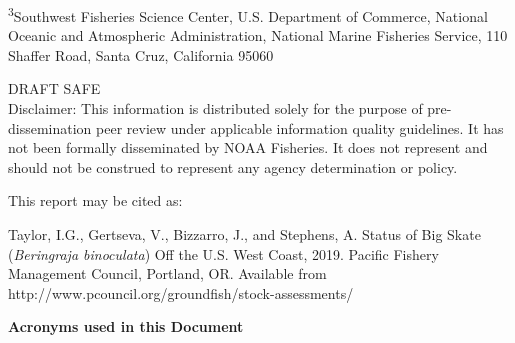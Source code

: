 \begin{center}
\textsuperscript{3}Southwest Fisheries Science Center, U.S. Department of Commerce, National Oceanic and Atmospheric Administration, National Marine Fisheries Service, 110 Shaffer Road, Santa Cruz, California 95060\\



\vspace{.5cm}

\vfill
DRAFT SAFE\\
Disclaimer: This information is distributed solely for the purpose of pre-dissemination
peer review under applicable information quality guidelines. It has not been formally
disseminated by NOAA Fisheries. It does not represent and should not be construed to
represent any agency determination or policy. 

\vspace{.3cm}


\newpage{\thispagestyle{empty}}

\vspace*{\fill}
\begin{flushleft}
This report may be cited as:

Taylor, I.G., Gertseva, V., Bizzarro, J., and Stephens, A. Status of Big Skate (\emph{Beringraja binoculata}) Off the U.S. West Coast, 2019. Pacific Fishery Management Council, Portland, OR. Available from http://www.pcouncil.org/groundfish/stock-assessments/
\end{flushleft}

\newpage{\thispagestyle{empty}}

\large{\textbf{Acronyms used in this Document}}

\vspace{.5cm}

\renewcommand{\arraystretch}{1.2}


\end{center}
